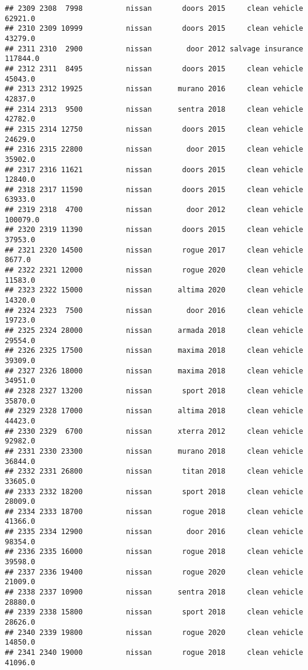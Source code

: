 \documentclass[
]{article}
\begin{document}
\begin{verbatim}
## 2309 2308  7998          nissan       doors 2015     clean vehicle   62921.0
## 2310 2309 10999          nissan       doors 2015     clean vehicle   43279.0
## 2311 2310  2900          nissan        door 2012 salvage insurance  117844.0
## 2312 2311  8495          nissan       doors 2015     clean vehicle   45043.0
## 2313 2312 19925          nissan      murano 2016     clean vehicle   42837.0
## 2314 2313  9500          nissan      sentra 2018     clean vehicle   42782.0
## 2315 2314 12750          nissan       doors 2015     clean vehicle   24629.0
## 2316 2315 22800          nissan        door 2015     clean vehicle   35902.0
## 2317 2316 11621          nissan       doors 2015     clean vehicle   12840.0
## 2318 2317 11590          nissan       doors 2015     clean vehicle   63933.0
## 2319 2318  4700          nissan        door 2012     clean vehicle  100079.0
## 2320 2319 11390          nissan       doors 2015     clean vehicle   37953.0
## 2321 2320 14500          nissan       rogue 2017     clean vehicle    8677.0
## 2322 2321 12000          nissan       rogue 2020     clean vehicle   11583.0
## 2323 2322 15000          nissan      altima 2020     clean vehicle   14320.0
## 2324 2323  7500          nissan        door 2016     clean vehicle   19723.0
## 2325 2324 28000          nissan      armada 2018     clean vehicle   29554.0
## 2326 2325 17500          nissan      maxima 2018     clean vehicle   39309.0
## 2327 2326 18000          nissan      maxima 2018     clean vehicle   34951.0
## 2328 2327 13200          nissan       sport 2018     clean vehicle   35870.0
## 2329 2328 17000          nissan      altima 2018     clean vehicle   44423.0
## 2330 2329  6700          nissan      xterra 2012     clean vehicle   92982.0
## 2331 2330 23300          nissan      murano 2018     clean vehicle   36844.0
## 2332 2331 26800          nissan       titan 2018     clean vehicle   33605.0
## 2333 2332 18200          nissan       sport 2018     clean vehicle   28009.0
## 2334 2333 18700          nissan       rogue 2018     clean vehicle   41366.0
## 2335 2334 12900          nissan        door 2016     clean vehicle   98354.0
## 2336 2335 16000          nissan       rogue 2018     clean vehicle   39598.0
## 2337 2336 19400          nissan       rogue 2020     clean vehicle   21009.0
## 2338 2337 10900          nissan      sentra 2018     clean vehicle   28880.0
## 2339 2338 15800          nissan       sport 2018     clean vehicle   28626.0
## 2340 2339 19800          nissan       rogue 2020     clean vehicle   14850.0
## 2341 2340 19000          nissan       rogue 2018     clean vehicle   41096.0

\end{verbatim}
\end{document}
